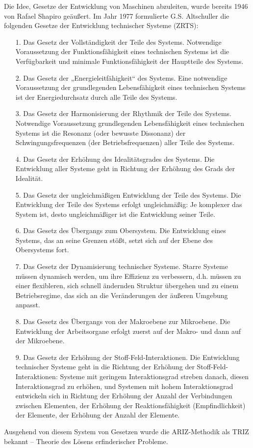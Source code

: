 \documentclass[11pt,a4paper]{article}
\begin{document}
Die Idee, Gesetze der Entwicklung von Maschinen abzuleiten, wurde bereits 1946
von Rafael Shapiro geäußert. Im Jahr 1977 formulierte G.S. Altschuller die
folgenden Gesetze der Entwicklung technischer Systeme (ZRTS):
\begin{itemize}
\item[1.] Das Gesetz der Vollständigkeit der Teile des Systems. Notwendige
  Voraussetzung der Funktionsfähigkeit eines technischen Systems ist die
  Verfügbarkeit und minimale Funktionsfähigkeit der Hauptteile des Systems.
\item[2.] Das Gesetz der „Energieleitfähigkeit“ des Systems. Eine notwendige
  Voraussetzung der grundlegenden Lebensfähigkeit eines technischen Systems
  ist der Energiedurchsatz durch alle Teile des Systems.
\item[3.] Das Gesetz der Harmonisierung der Rhythmik der Teile des Systems.
  Notwendige Voraussetzung grundlegenden Lebensfähigkeit eines technischen
  Systems ist die Resonanz (oder bewusste Dissonanz) der Schwingungsfrequenzen
  (der Betriebsfrequenzen) aller Teile des Systems.
\item[4.] Das Gesetz der Erhöhung des Idealitätsgrades des Systems. Die
  Entwicklung aller Systeme geht in Richtung der Erhöhung des Grads der
  Idealität.
\item[5.] Das Gesetz der ungleichmäßigen Entwicklung der Teile des Systems.
  Die Entwicklung der Teile des Systems erfolgt ungleichmäßig: Je komplexer
  das System ist, desto ungleichmäßiger ist die Entwicklung seiner Teile.
\item[6.] Das Gesetz des Übergangs zum Obersystem. Die Entwicklung eines
  Systems, das an seine Grenzen stößt, setzt sich auf der Ebene des
  Obersystems fort.
\item[7.] Das Gesetz der Dynamisierung technischer Systeme. Starre Systeme
  müssen dynamisch werden, um ihre Effizienz zu verbessern, d.h. müssen zu
  einer flexibleren, sich schnell ändernden Struktur übergehen und zu einem
  Betriebsregime, das sich an die Veränderungen der äußeren Umgebung anpasst.
\item[8.] Das Gesetz des Übergangs von der Makroebene zur Mikroebene. Die
  Entwicklung der Arbeitsorgane erfolgt zuerst auf der Makro- und dann auf der
  Mikroebene.
\item[9.] Das Gesetz der Erhöhung der Stoff-Feld-Interaktionen. Die
  Entwicklung technischer Systeme geht in die Richtung der Erhöhung der
  Stoff-Feld-Interaktionen: Systeme mit geringem Interaktionsgrad streben
  danach, diesen Interaktionsgrad zu erhöhen, und Systemen mit hohem
  Interaktionsgrad entwickeln sich in Richtung der Erhöhung der Anzahl der
  Verbindungen zwischen Elementen, der Erhöhung der Reaktionsfähigkeit
  (Empfindlichkeit) der Elemente, der Erhöhung der Anzahl der Elemente.
\end{itemize}
Ausgehend von diesem System von Gesetzen wurde die ARIZ-Methodik als TRIZ
bekannt -- Theorie des Lösens erfinderischer Probleme.
\end{document}
